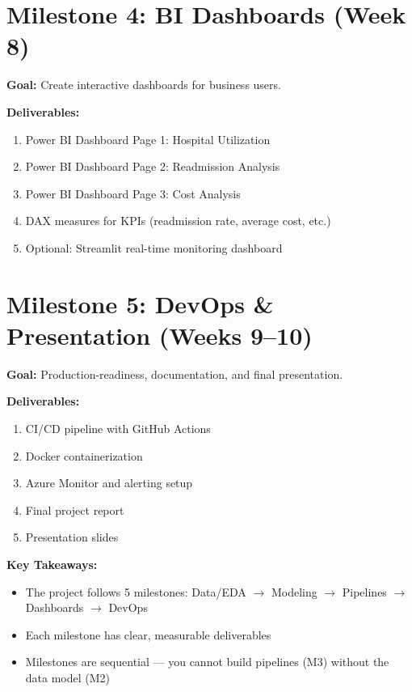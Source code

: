 \documentclass[12pt, a4paper, oneside]{report}
\begin{document}
\section{Milestone 4: BI Dashboards (Week 8)}

\textbf{Goal:} Create interactive dashboards for business users.

\textbf{Deliverables:}
\begin{enumerate}[label=\ding{51}]
    \item Power BI Dashboard Page 1: Hospital Utilization
    \item Power BI Dashboard Page 2: Readmission Analysis
    \item Power BI Dashboard Page 3: Cost Analysis
    \item DAX measures for KPIs (readmission rate, average cost, etc.)
    \item Optional: Streamlit real-time monitoring dashboard
\end{enumerate}

\section{Milestone 5: DevOps \& Presentation (Weeks 9--10)}

\textbf{Goal:} Production-readiness, documentation, and final presentation.

\textbf{Deliverables:}
\begin{enumerate}[label=\ding{51}]
    \item CI/CD pipeline with GitHub Actions
    \item Docker containerization
    \item Azure Monitor and alerting setup
    \item Final project report
    \item Presentation slides
\end{enumerate}

\begin{summarybox}
\textbf{Key Takeaways:}
\begin{itemize}
    \item The project follows 5 milestones: Data/EDA $\rightarrow$ Modeling $\rightarrow$ Pipelines $\rightarrow$ Dashboards $\rightarrow$ DevOps
    \item Each milestone has clear, measurable deliverables
    \item Milestones are sequential --- you cannot build pipelines (M3) without the data model (M2)
\end{itemize}
\end{summarybox}
\end{document}
